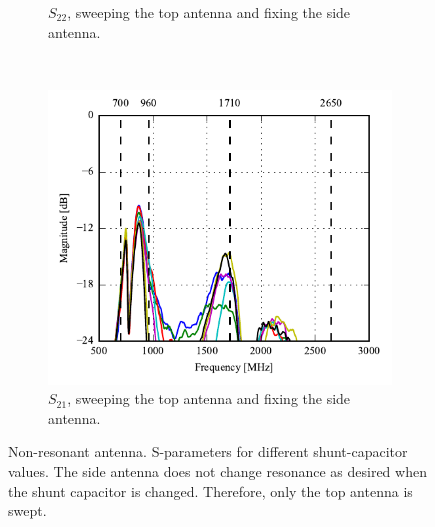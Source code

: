 \begin{figure}[htbp]
\begin{subfigure}{0.49\linewidth}
        \caption{$S_{22}$, sweeping the top antenna and fixing the side antenna.}
    \end{subfigure}
    \\
    \begin{subfigure}{0.49\linewidth}
        \centering
        \includegraphics{img/tech_sol/nonresonant/prototype/s21_csh1.pdf}
        \caption{$S_{21}$, sweeping the top antenna and fixing the side antenna.}
    \end{subfigure}
    \caption{Non-resonant antenna. S-parameters for different shunt-capacitor values. The side antenna does not change resonance as desired when the shunt capacitor is changed. Therefore, only the top antenna is swept.}
    \label{fig:nonresonant_proto_sweep_sparams}
\end{figure}


